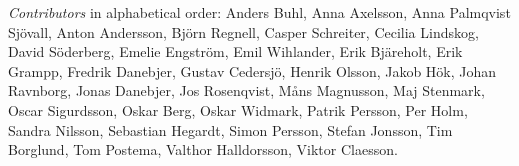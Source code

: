 \emph{Contributors} in alphabetical order:
Anders Buhl,
Anna Axelsson,
Anna Palmqvist Sjövall,
Anton Andersson,
Björn Regnell,
Casper Schreiter,
Cecilia Lindskog,
David Söderberg,
Emelie Engström,
Emil Wihlander,
Erik Bjäreholt,
Erik Grampp,
Fredrik Danebjer,
Gustav Cedersjö,
Henrik Olsson,
Jakob Hök,
Johan Ravnborg,
Jonas Danebjer,
Jos Rosenqvist,
Måns Magnusson,
Maj Stenmark,
Oscar Sigurdsson,
Oskar Berg,
Oskar Widmark,
Patrik Persson,
Per Holm,
Sandra Nilsson,
Sebastian Hegardt,
Simon Persson,
Stefan Jonsson,
Tim Borglund,
Tom Postema,
Valthor Halldorsson, 
Viktor Claesson.
